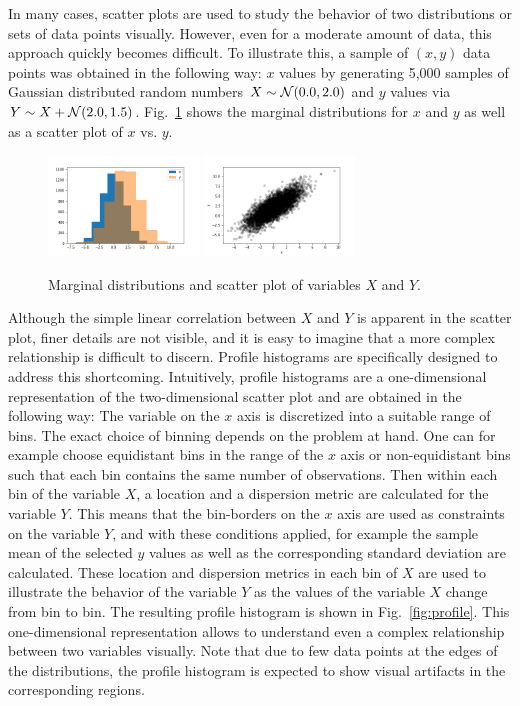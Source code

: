 \documentclass[BCOR=1mm, DIV=calc,10pt,
twoside=true,
twocolumn,
headings=normal]{scrartcl}
\newcommand{\fig}{Fig.~}
\begin{document}
In many cases, scatter plots are used to study the behavior of two distributions or sets of data points visually. However, even for a moderate amount of data, this approach quickly becomes difficult. To illustrate this, a sample of $(x,y)$ data points was obtained in the following way: $x$ values by generating 5,000 samples of Gaussian distributed random numbers $X \sim {\cal N}(0.0,2.0)$ and $y$ values via $Y \sim X +  {\cal N}(2.0,1.5)$. \fig \ref{fig:scatter} shows the marginal distributions for $x$ and $y$ as well as a scatter plot of $x$ vs. $y$.

\begin{figure}
\begin{center}
\includegraphics[width=4cm]{marginal}
\includegraphics[width=4cm]{scatter}
\caption{\label{fig:scatter} Marginal distributions and scatter plot of variables $X$ and $Y$.}
\end{center}
\end{figure}

Although the simple linear correlation between $X$ and $Y$ is apparent in the scatter plot, finer details are not visible, and it is easy to imagine that a more complex relationship is difficult to discern. Profile histograms are specifically designed to address this shortcoming. Intuitively, profile histograms are a one-dimensional representation of the two-dimensional scatter plot and are obtained  in the following way: The variable on the $x$ axis is discretized into a suitable range of bins. The exact choice of binning depends on the problem at hand. One can for example choose equidistant bins in the range of the $x$ axis or non-equidistant bins such that each bin contains the same number of observations. Then within each bin of the variable $X$, a location and a dispersion metric are calculated for the variable $Y$. This means that the bin-borders on the $x$ axis are used as constraints on the variable $Y$, and with these conditions applied, for example the sample mean of the selected $y$ values as well as the corresponding standard deviation are calculated. These location and dispersion metrics in each bin of $X$ are used to illustrate the behavior of the variable $Y$ as the values of the variable $X$ change from bin to bin. The resulting profile histogram is shown in \fig \ref{fig:profile}. This one-dimensional representation allows to understand even a complex relationship between two variables visually. Note that due to few data points at the edges of the distributions, the profile histogram is expected to show visual artifacts in the corresponding regions.
\end{document}
